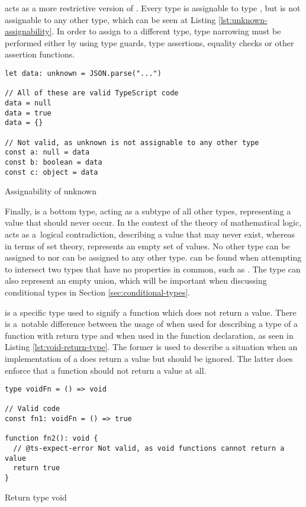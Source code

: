  acts as a more restrictive version of . Every type is assignable to type , but  is not assignable to any other type, which can be seen at Listing \ref{lst:unknown-assignability}. In order to assign  to a different type, type narrowing must be performed either by using type guards, type assertions, equality checks or other assertion functions.

\clearpage

\begin{listing}[ht]
  \begin{verbatim}
let data: unknown = JSON.parse("...") 

// All of these are valid TypeScript code
data = null
data = true
data = {}

// Not valid, as unknown is not assignable to any other type
const a: null = data
const b: boolean = data
const c: object = data
  \end{verbatim}
  \caption{Assignability of unknown}\label{lst:unknown-assignability}
\end{listing}

Finally,  is a bottom type, acting as a subtype of all other types, representing a value that should never occur. In the context of the theory of mathematical logic,  acts as a~logical contradiction, describing a value that may never exist, whereas in terms of set theory,  represents an empty set of values. No other type can be assigned to  nor  can be assigned to any other type.  can be found when attempting to intersect two types that have no properties in common, such as . The  type can also represent an empty union, which will be important when discussing conditional types in Section \ref{sec:conditional-types}.

 is a specific type used to signify a function which does not return a value. There is a~notable difference between the usage of  when used for describing a type of a function with  return type and when used in the function declaration, as seen in Listing \ref{lst:void-return-type}. The former is used to describe a situation when an implementation of a  does return a value but should be ignored. The latter does enforce that a function should not return a value at all.

\begin{listing}[ht]
  \begin{verbatim}
type voidFn = () => void

// Valid code
const fn1: voidFn = () => true

function fn2(): void {
  // @ts-expect-error Not valid, as void functions cannot return a value
  return true
}
\end{verbatim}
  \caption{Return type void}\label{lst:void-return-type}
\end{listing}

